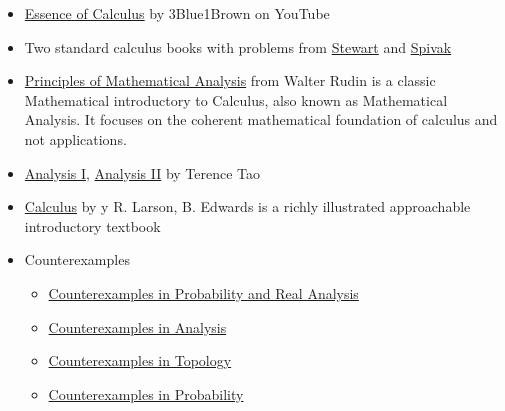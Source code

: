 \documentclass{article}
\begin{document}
\begin{itemize}
\begin{itemize}
        \item \href{https://www.youtube.com/watch?v=WUvTyaaNkzM&list=PLZHQObOWTQDMsr9K-rj53DwVRMYO3t5Yr}{Essence of Calculus} by  3Blue1Brown on YouTube
        
        \item Two standard calculus books with problems from \href{https://www.goodreads.com/book/show/61298.Calculus}{Stewart} and \href{https://www.goodreads.com/book/show/328645.Calculus}{Spivak}
        
        \item \href{https://www.goodreads.com/book/show/292079.Principles_of_Mathematical_Analysis}{Principles of Mathematical Analysis} from Walter Rudin is a classic Mathematical introductory to Calculus, also known as Mathematical Analysis. It focuses on the coherent mathematical foundation of calculus and not applications.
        
        \item \href{https://www.goodreads.com/book/show/502785.Analysis_I}{Analysis I}, \href{https://www.goodreads.com/book/show/2578776-analysis-ii}{Analysis II} by Terence Tao

        \item \href{http://teacherpress.ocps.net/cynthiaandrews/files/2013/06/Calculus-9th-Edition-by-Ron-Larson-Bruce-H.-Edwards.pdf}{Calculus} by y R. Larson, B. Edwards is a richly illustrated approachable introductory textbook
        
        \item Counterexamples
            \begin{itemize}
            \item \href{https://www.goodreads.com/book/show/1402795.Counterexamples_in_Probability_and_Real_Analysis}{Counterexamples in Probability and Real Analysis}
        
            \item \href{https://www.goodreads.com/en/book/show/818070.Counterexamples_in_Analysis}{Counterexamples in Analysis}
        
            \item \href{https://www.goodreads.com/book/show/116419.Counterexamples_in_Topology}{Counterexamples in Topology}
        
            \item \href{https://www.goodreads.com/book/show/2106285.Counterexamples_in_Probability}{Counterexamples in Probability}
    
    \end{itemize}
        

\end{itemize}
\end{itemize}
\end{document}
